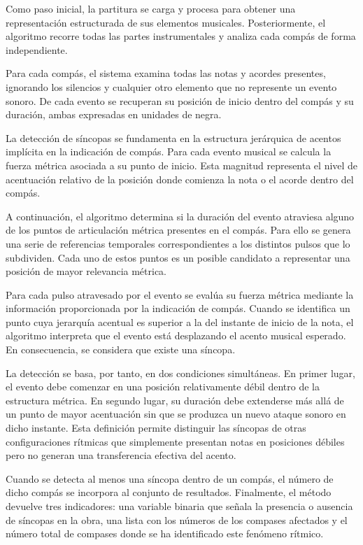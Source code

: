Como paso inicial, la partitura se carga y procesa para obtener una representación estructurada de sus elementos musicales. Posteriormente, el algoritmo recorre todas las partes instrumentales y analiza cada compás de forma independiente.

Para cada compás, el sistema examina todas las notas y acordes presentes, ignorando los silencios y cualquier otro elemento que no represente un evento sonoro. De cada evento se recuperan su posición de inicio dentro del compás y su duración, ambas expresadas en unidades de negra.

La detección de síncopas se fundamenta en la estructura jerárquica de acentos implícita en la indicación de compás. Para cada evento musical se calcula la fuerza métrica asociada a su punto de inicio. Esta magnitud representa el nivel de acentuación relativo de la posición donde comienza la nota o el acorde dentro del compás.

A continuación, el algoritmo determina si la duración del evento atraviesa alguno de los puntos de articulación métrica presentes en el compás. Para ello se genera una serie de referencias temporales correspondientes a los distintos pulsos que lo subdividen. Cada uno de estos puntos es un posible candidato a representar una posición de mayor relevancia métrica.

Para cada pulso atravesado por el evento se evalúa su fuerza métrica mediante la información proporcionada por la indicación de compás. Cuando se identifica un punto cuya jerarquía acentual es superior a la del instante de inicio de la nota, el algoritmo interpreta que el evento está desplazando el acento musical esperado. En consecuencia, se considera que existe una síncopa.

La detección se basa, por tanto, en dos condiciones simultáneas. En primer lugar, el evento debe comenzar en una posición relativamente débil dentro de la estructura métrica. En segundo lugar, su duración debe extenderse más allá de un punto de mayor acentuación sin que se produzca un nuevo ataque sonoro en dicho instante. Esta definición permite distinguir las síncopas de otras configuraciones rítmicas que simplemente presentan notas en posiciones débiles pero no generan una transferencia efectiva del acento.

Cuando se detecta al menos una síncopa dentro de un compás, el número de dicho compás se incorpora al conjunto de resultados. Finalmente, el método devuelve tres indicadores: una variable binaria que señala la presencia o ausencia de síncopas en la obra, una lista con los números de los compases afectados y el número total de compases donde se ha identificado este fenómeno rítmico.

